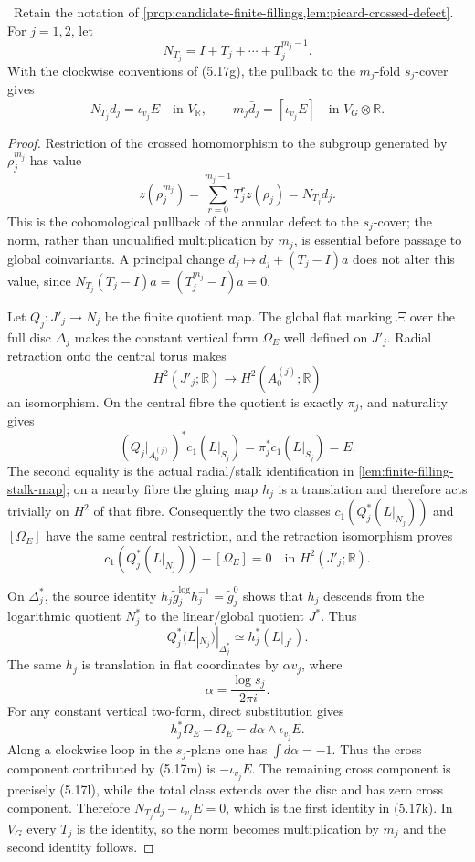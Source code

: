 \begin{lemma}
\label{lem:picard-finite-norm}
\Verified\ Retain the notation of
\cref{prop:candidate-finite-fillings,lem:picard-crossed-defect}.  For
$j=1,2$, let
\[
 N_{T_j}=I+T_j+\cdots+T_j^{m_j-1}.
\]
With the clockwise conventions of (5.17g), the pullback to the
$m_j$-fold $s_j$-cover gives
\[
 N_{T_j}d_j=\iota_{v_j}E
 \quad\text{in }V_{\mathbb R},
\qquad
 m_j\bar d_j=[\iota_{v_j}E]
 \quad\text{in }V_G\otimes\mathbb R.
\tag{5.17k}
\]
\end{lemma}

\begin{proof}
Restriction of the crossed homomorphism to the subgroup generated by
$\rho_j^{m_j}$ has value
\[
 z(\rho_j^{m_j})
 =\sum_{r=0}^{m_j-1}T_j^rz(\rho_j)=N_{T_j}d_j.
\tag{5.17l}
\]
This is the cohomological pullback of the annular defect to the
$s_j$-cover; the norm, rather than unqualified multiplication by $m_j$, is
essential before passage to global coinvariants.  A principal change
$d_j\mapsto d_j+(T_j-I)a$ does not alter this value, since
$N_{T_j}(T_j-I)a=(T_j^{m_j}-I)a=0$.

Let $Q_j:J'_j\to N_j$ be the finite quotient map.  The global flat marking
$\Xi$ over the full disc $\Delta_j$ makes the constant vertical form
$\Omega_E$ well defined on $J'_j$.  Radial retraction onto the central
torus makes
\[
 H^2(J'_j;\mathbb R)\longrightarrow H^2(A_0^{(j)};\mathbb R)
\]
an isomorphism.  On the central fibre the quotient is exactly $\pi_j$, and
naturality gives
\[
 (Q_j|_{A_0^{(j)}})^*c_1(L|_{S_j})
 =\pi_j^*c_1(L|_{S_j})=E.
\tag{5.17l'}
\]
The second equality is the actual radial/stalk identification in
\cref{lem:finite-filling-stalk-map}; on a nearby fibre the gluing map $h_j$
is a translation and therefore acts trivially on $H^2$ of that fibre.
Consequently the two classes
$c_1(Q_j^*(L|_{N_j}))$ and $[\Omega_E]$ have the same central restriction,
and the retraction isomorphism proves
\[
 c_1(Q_j^*(L|_{N_j}))-[\Omega_E]=0
 \quad\text{in }H^2(J'_j;\mathbb R).
\tag{5.17l''}
\]

On $\Delta_j^*$, the source identity
$h_j\widetilde g_j^{\log}h_j^{-1}=\widetilde g_j^0$ shows that $h_j$
descends from the logarithmic quotient $N_j^*$ to the linear/global
quotient $J^*$.  Thus
\[
 Q_j^*(L|_{N_j})|_{\Delta_j^*}
 \simeq h_j^*(L|_{J^*}).
\tag{5.17l'''}
\]
The same $h_j$ is translation in flat coordinates by $\alpha v_j$, where
\[
 \alpha=\frac{\log s_j}{2\pi i}.
\]
For any constant vertical two-form, direct substitution gives
\[
 h_j^*\Omega_E-\Omega_E
 =d\alpha\wedge\iota_{v_j}E.
\tag{5.17m}
\]
Along a clockwise loop in the $s_j$-plane one has
$\int d\alpha=-1$.  Thus the cross component contributed by (5.17m) is
$-\iota_{v_j}E$.  The remaining cross component is precisely (5.17l),
while the total class extends over the disc and has zero cross component.
Therefore $N_{T_j}d_j-\iota_{v_j}E=0$, which is the first identity in
(5.17k).  In $V_G$ every $T_j$ is the identity, so the norm becomes
multiplication by $m_j$ and the second identity follows.
\end{proof}

